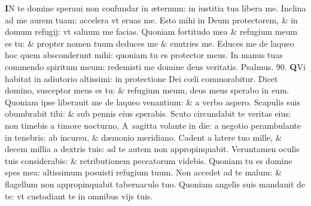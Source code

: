 \documentclass[a5paper,10pt]{book}
\def\ae{æ}
\def\oe{œ}
\begin{document}
\begin{multicols*}{2}
\vspace{-.5em}
\lettrine[lines=2]{\bfseries \color{red} I}{}N te domine speraui non confundar in \ae ternum: in iustitia tua libera me.
\newline \color{red} I\color{black}nclina ad me aurem tuam: accelera vt eruas me.
\newline \color{red} E\color{black}sto mihi in Deum protectorem, \& in domum refugij: vt saluum me facias.
\newline \color{red} Q\color{black}uoniam fortitudo mea \& refugium meum es tu: \& propter nomen tuum deduces me \& enutries me.
\newline \color{red} E\color{black}duces me de laqueo hoc quem absconderunt mihi: quoniam tu es protector meus.
\newline \color{red} I\color{black}n manus tuas commendo spiritum meum: redemisti me domine deus veritatis. \quad \color{red} Psalmus. 90. \color{black}
\vspace{-.5em}
\lettrine[lines=2]{\bfseries \color{red} Q}{}Vi habitat in adiutorio altissimi: in protectione Dei c\oe li commorabitur.
\newline \color{red} D\color{black}icet domino, susceptor meus es tu: \& refugium meum, deus meus sperabo in eum.
\newline \color{red} Q\color{black}uoniam ipse liberauit me de laqueo venantium: \& a verbo aspero.
\newline \color{red} S\color{black}capulis suis obumbrabit tibi: \& sub pennis eius sperabis.
\newline \color{red} S\color{black}cuto circundabit te veritas eius: non timebis a timore nocturno,
\newline \color{red} A\color{black}\ sagitta volante in die: a negotio perambulante in tenebris: ab incursu, \& d\ae monio meridiano.
\newline \color{red} C\color{black}adent a latere tuo mille, \& decem millia a dextris tuis: ad te autem non appropinquabit.
\newline \color{red} V\color{black}eruntamen oculis tuis considerabis: \& retributionem peccatorum videbis.
\newline \color{red} Q\color{black}uoniam tu es domine spes mea: altissimum posuisti refugium tuum.
\newline \color{red} N\color{black}on accedet ad te malum: \& flagellum non appropinquabit tabernaculo tuo.
\newline \color{red} Q\color{black}uoniam angelis suis mandauit de te: vt custodiant te in omnibus vijs tuis.

\end{multicols*}
\end{document}
